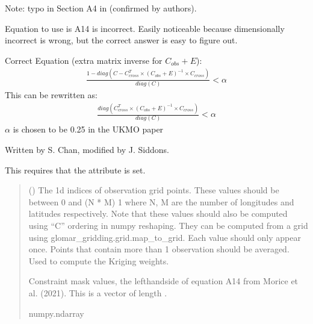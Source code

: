 \documentclass[letterpaper,10pt,english]{sphinxmanual}
\begin{document}
\begin{fulllineitems}
\begin{fulllineitems}
\sphinxAtStartPar
Note: typo in Section A4 in  (confirmed by authors).

\sphinxAtStartPar
Equation to use is A14 is incorrect. Easily noticeable because
dimensionally incorrect is wrong, but the correct answer is easy to
figure out.

\sphinxAtStartPar
Correct Equation (extra matrix inverse for \(C_{obs} + E\)):
\begin{equation*}
\begin{split}\frac{
    1 - diag(C - C_{cross}^T \times (C_{obs} + E)^{-1}
             \times C_{cross})
}{diag(C)} < \alpha\end{split}
\end{equation*}
\sphinxAtStartPar
This can be re\sphinxhyphen{}written as:
\begin{equation*}
\begin{split}\frac{
    diag(C_{cross}^T \times (C_{obs} + E)^{-1} \times C_{cross})
}{diag(C)} < \alpha\end{split}
\end{equation*}
\sphinxAtStartPar
\(\alpha\) is chosen to be 0.25 in the UKMO paper

\sphinxAtStartPar
Written by S. Chan, modified by J. Siddons.

\sphinxAtStartPar
This requires that the  attribute is set.
\begin{quote}\begin{description}
\sphinxAtStartPar
{} () \textendash{} The 1d indices of observation grid points. These values should be
between 0 and (N * M) \sphinxhyphen{} 1 where N, M are the number of longitudes
and latitudes respectively. Note that these values should also be
computed using “C” ordering in numpy reshaping. They can be
computed from a grid using glomar\_gridding.grid.map\_to\_grid. Each
value should only appear once. Points that contain more than 1
observation should be averaged. Used to compute the Kriging weights.

\sphinxAtStartPar
{} \textendash{} Constraint mask values, the left\sphinxhyphen{}hand\sphinxhyphen{}side of equation A14 from
Morice et al. (2021). This is a vector of length .

\sphinxAtStartPar
numpy.ndarray


\end{description}
\end{quote}
\end{fulllineitems}
\end{fulllineitems}
\end{document}
